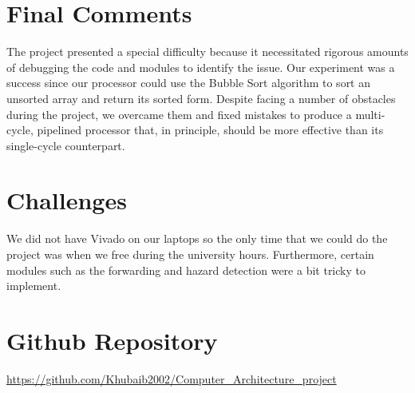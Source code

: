 \documentclass{article}
\begin{document}
\section{Final Comments}
The project presented a special difficulty because it necessitated rigorous amounts of debugging the code and modules to identify the issue. Our experiment was a success since our processor could use the Bubble Sort algorithm to sort an unsorted array and return its sorted form. Despite facing a number of obstacles during the project, we overcame them and fixed mistakes to produce a multi-cycle, pipelined processor that, in principle, should be more effective than its single-cycle counterpart.

\section{Challenges}
We did not have Vivado on our laptops so the only time that we could do the project was when we free during the university hours. Furthermore, certain modules such as  the forwarding and hazard detection were a bit tricky to implement.


\section{Github Repository}

\url{https://github.com/Khubaib2002/Computer_Architecture_project}
\end{document}
